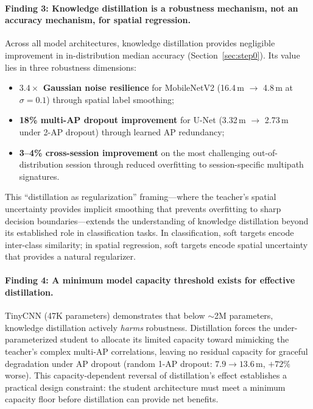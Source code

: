 \documentclass[11pt,a4paper]{article}
\begin{document}
\paragraph{Finding 3: Knowledge distillation is a robustness mechanism, not an accuracy mechanism, for spatial regression.}
Across all model architectures, knowledge distillation provides negligible improvement in in-distribution median accuracy (Section~\ref{sec:step0}).
Its value lies in three robustness dimensions:
\begin{itemize}[nosep]
  \item \textbf{$3.4\times$ Gaussian noise resilience} for MobileNetV2 (16.4\,m $\to$ 4.8\,m at $\sigma = 0.1$) through spatial label smoothing;
  \item \textbf{18\% multi-AP dropout improvement} for U-Net (3.32\,m $\to$ 2.73\,m under 2-AP dropout) through learned AP redundancy;
  \item \textbf{3--4\% cross-session improvement} on the most challenging out-of-distribution session through reduced overfitting to session-specific multipath signatures.
\end{itemize}
This ``distillation as regularization'' framing---where the teacher's spatial uncertainty provides implicit smoothing that prevents overfitting to sharp decision boundaries---extends the understanding of knowledge distillation beyond its established role in classification tasks.
In classification, soft targets encode inter-class similarity; in spatial regression, soft targets encode spatial uncertainty that provides a natural regularizer.

\paragraph{Finding 4: A minimum model capacity threshold exists for effective distillation.}
TinyCNN (47K parameters) demonstrates that below $\sim$2M parameters, knowledge distillation actively \emph{harms} robustness.
Distillation forces the under-parameterized student to allocate its limited capacity toward mimicking the teacher's complex multi-AP correlations, leaving no residual capacity for graceful degradation under AP dropout (random 1-AP dropout: $7.9 \to 13.6$\,m, $+72\%$ worse).
This capacity-dependent reversal of distillation's effect establishes a practical design constraint: the student architecture must meet a minimum capacity floor before distillation can provide net benefits.
\end{document}

